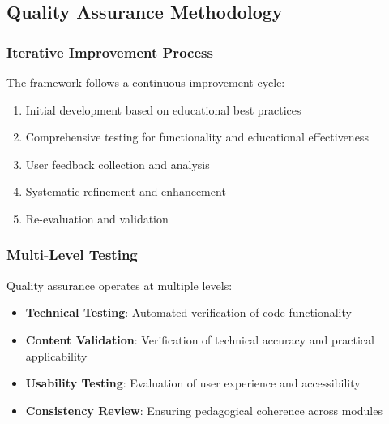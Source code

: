 \subsection{Quality Assurance Methodology}

\subsubsection{Iterative Improvement Process}

The framework follows a continuous improvement cycle:
\begin{enumerate}
    \item Initial development based on educational best practices
    \item Comprehensive testing for functionality and educational effectiveness
    \item User feedback collection and analysis
    \item Systematic refinement and enhancement
    \item Re-evaluation and validation
\end{enumerate}

\subsubsection{Multi-Level Testing}

Quality assurance operates at multiple levels:
\begin{itemize}
    \item \textbf{Technical Testing}: Automated verification of code functionality
    \item \textbf{Content Validation}: Verification of technical accuracy and practical applicability
    \item \textbf{Usability Testing}: Evaluation of user experience and accessibility
    \item \textbf{Consistency Review}: Ensuring pedagogical coherence across modules
\end{itemize}